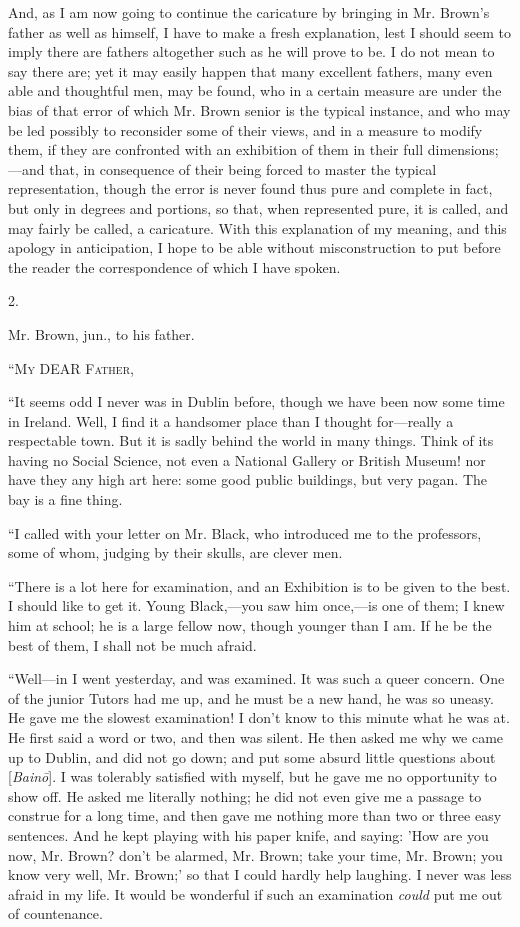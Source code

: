 And, as I am now going to continue the caricature by bringing in
Mr. Brown's father as well as himself, I have to make a fresh
explanation, lest I should seem to imply there are fathers altogether
such as he will prove to be. I do not mean to say there are; yet it
may easily happen that many excellent fathers, many even able and
thoughtful men, may be found, who in a certain measure are under the
bias of that error of which Mr. Brown senior is the typical instance,
and who may be led possibly to reconsider some of their views, and in
a measure to modify them, if they are confronted with an exhibition of
them in their full dimensions;—and that, in consequence of their
being forced to master the typical representation, though the error is
never found thus pure and complete in fact, but only in degrees and
portions, so that, when represented pure, it is called, and may fairly
be called, a caricature. With this explanation of my meaning, and this
apology in anticipation, I hope to be able without misconstruction to
put before the reader the correspondence of which I have spoken.

2.

Mr. Brown, jun., to his father.

``M\textsc{y} DEAR F\textsc{ather},

``It seems odd I never was in Dublin before, though we have been
now some time in Ireland. Well, I find it a handsomer place than
I thought for—really a respectable town. But it is sadly behind the
world in many things. Think of its having no Social Science, not even
a National Gallery or British Museum! nor have they any high art here:
some good public buildings, but very pagan. The bay is a fine thing.

``I called with your letter on Mr. Black, who introduced me to
the professors, some of whom, judging by their skulls, are clever men.

``There is a lot here for examination, and an Exhibition is to
be given to the best. I should like to get it. Young Black,—you saw
him once,—is one of them; I knew him at school; he is a large fellow
now, though younger than I am. If he be the best of them, I shall not
be much afraid.

``Well—in I went yesterday, and was examined. It was such a
queer concern. One of the junior Tutors had me up, and he must be a
new hand, he was so uneasy. He gave me the slowest examination! I don't
know to this minute what he was at. He first said a word or two, and
then was silent. He then asked me why we came up to Dublin, and did
not go down; and put some absurd little questions about [\emph{Bain\={o}}].
I was tolerably satisfied with myself, but he gave me no opportunity
to show off. He asked me literally nothing; he did not even give me a
passage to construe for a long time, and then gave me nothing more
than two or three easy sentences. And he kept playing with his paper
knife, and saying: 'How are you now, Mr. Brown? don't be alarmed, Mr.
Brown; take your time, Mr. Brown; you know very well, Mr. Brown;' so
that I could hardly help laughing. I never was less afraid in my life.
It would be wonderful if such an examination \emph{could} put me out
of countenance.

